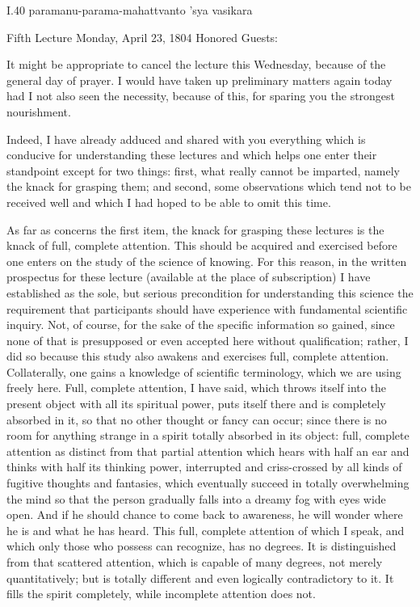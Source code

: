 I.40
paramanu-parama-mahattvanto 'sya vasikara

Fifth Lecture
Monday, April 23, 1804
Honored Guests:

It might be appropriate to cancel the lecture this Wednesday,
because of the general day of prayer.
I would have taken up preliminary matters again today
had I not also seen the necessity, because of this,
for sparing you the strongest nourishment.

Indeed, I have already adduced and shared with you
everything which is conducive for understanding these lectures
and which helps one enter their standpoint except for two things:
first, what really cannot be imparted,
namely the knack for grasping them;
and second, some observations which tend
not to be received well and which
I had hoped to be able to omit this time.

As far as concerns the first item,
the knack for grasping these lectures is
the knack of full, complete attention.
This should be acquired and exercised
before one enters on the study of the science of knowing.
For this reason, in the written prospectus for these lecture
(available at the place of subscription)
I have established as the sole, but serious precondition
for understanding this science the requirement
that participants should have experience with
fundamental scientific inquiry.
Not, of course, for the sake of
the specific information so gained,
since none of that is presupposed
or even accepted here without qualification;
rather, I did so because this study also
awakens and exercises full, complete attention.
Collaterally, one gains a knowledge of scientific terminology,
which we are using freely here.
Full, complete attention, I have said,
which throws itself into the present object
with all its spiritual power,
puts itself there and is completely absorbed in it,
so that no other thought or fancy can occur;
since there is no room for anything strange
in a spirit totally absorbed in its object:
full, complete attention as distinct
from that partial attention
which hears with half an ear
and thinks with half its thinking power,
interrupted and criss-crossed by
all kinds of fugitive thoughts and fantasies,
which eventually succeed in totally overwhelming
the mind so that the person gradually falls
into a dreamy fog with eyes wide open.
And if he should chance to come back to awareness,
he will wonder where he is and what he has heard.
This full, complete attention of which I speak,
and which only those who possess can recognize, has no degrees.
It is distinguished from that scattered attention,
which is capable of many degrees, not merely quantitatively;
but is totally different and even logically contradictory to it.
It fills the spirit completely,
while incomplete attention does not.

